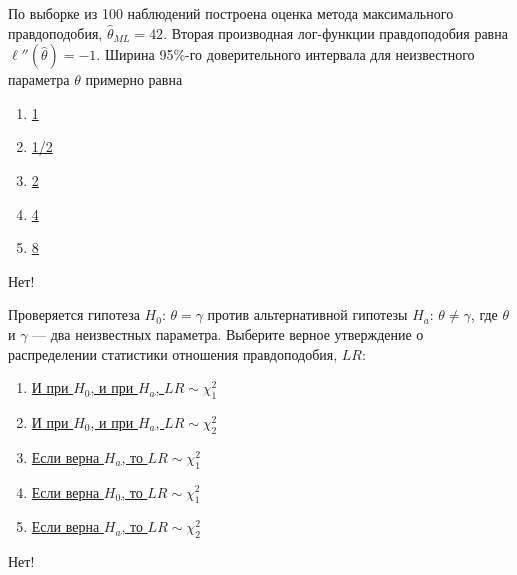 \documentclass[t]{beamer}
\begin{document}
 \begin{frame} \label{37-No} 
\begin{block}{37} 

По выборке из 100 наблюдений построена оценка метода максимального правдоподобия, $\hat \theta_{ML} = 42$. Вторая производная лог-функции правдоподобия равна $\ell''(\hat\theta) = -1$. Ширина 95\%-го доверительного интервала для неизвестного параметра $\theta$ примерно равна
  


 \end{block} 
\begin{enumerate} 
\item[] \hyperlink{37-No}{\beamergotobutton{} 1}
\item[] \hyperlink{37-No}{\beamergotobutton{} 1/2}
\item[] \hyperlink{37-No}{\beamergotobutton{} 2}
\item[] \hyperlink{37-Yes}{\beamergotobutton{} 4}
\item[] \hyperlink{37-No}{\beamergotobutton{} 8}
\end{enumerate} 

 \alert{Нет!} 
\end{frame} 


 \begin{frame} \label{38-No} 
\begin{block}{38} 

  Проверяется гипотеза $H_0$: $\theta = \gamma$ против альтернативной гипотезы $H_a$: $\theta \neq \gamma$, где $\theta$ и $\gamma$ — два неизвестных параметра. Выберите верное утверждение о распределении статистики отношения правдоподобия, $LR$:

  


 \end{block} 
\begin{enumerate} 
\item[] \hyperlink{38-No}{\beamergotobutton{} И при $H_0$, и при $H_a$, $LR \sim \chi_1^2$}
\item[] \hyperlink{38-No}{\beamergotobutton{} И при $H_0$, и при $H_a$, $LR \sim \chi_2^2$}
\item[] \hyperlink{38-No}{\beamergotobutton{} Если верна $H_a$, то $LR \sim \chi_1^2$}
\item[] \hyperlink{38-Yes}{\beamergotobutton{} Если верна $H_0$, то $LR \sim \chi_1^2$}
\item[] \hyperlink{38-No}{\beamergotobutton{} Если верна $H_a$, то $LR \sim \chi_2^2$}
\end{enumerate} 

 \alert{Нет!} 
\end{frame} 
\end{document}
